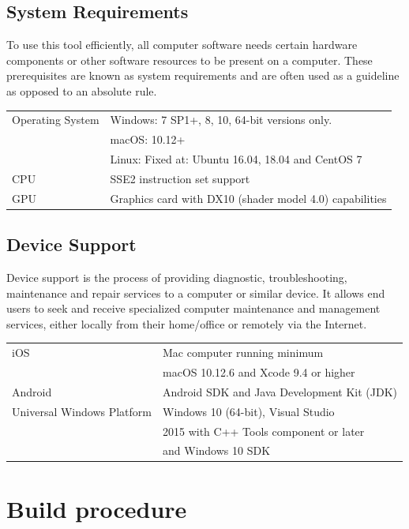 \documentclass[11pt]{article}
\begin{document}
\subsection{System Requirements}
\label{sec:org9b9ff4b}
To use this tool efficiently, all computer software needs certain hardware components or
other software resources to be present on a computer. These prerequisites are known as system
requirements and are often used as a guideline as opposed to an absolute rule.
\begin{center}
\begin{tabular}{ll}
\hline
Operating System & Windows: 7 SP1+, 8, 10, 64-bit versions only.\\
 & macOS: 10.12+\\
 & Linux: Fixed at: Ubuntu 16.04, 18.04 and CentOS 7\\
\hline
CPU & SSE2 instruction set support\\
\hline
GPU & Graphics card with DX10 (shader model 4.0) capabilities\\
\hline
\end{tabular}
\end{center}
\subsection{Device Support}
\label{sec:org23a58ae}
Device support is the process of providing diagnostic, troubleshooting, maintenance
and repair services to a computer or similar device. It allows end users to seek and
receive specialized computer maintenance and management services, either locally from
their home/office or remotely via the Internet.
\begin{center}
\begin{tabular}{ll}
\hline
iOS & Mac computer running minimum\\
 & macOS 10.12.6 and Xcode 9.4 or higher\\
\hline
Android & Android SDK and Java Development Kit (JDK)\\
\hline
Universal Windows Platform & Windows 10 (64-bit), Visual Studio\\
 & 2015 with C++ Tools component or later\\
 & and Windows 10 SDK\\
\hline
\end{tabular}
\end{center}
\clearpage
\section{Build procedure}
\label{sec:orgcb2621c}
\clearpage
\end{document}
